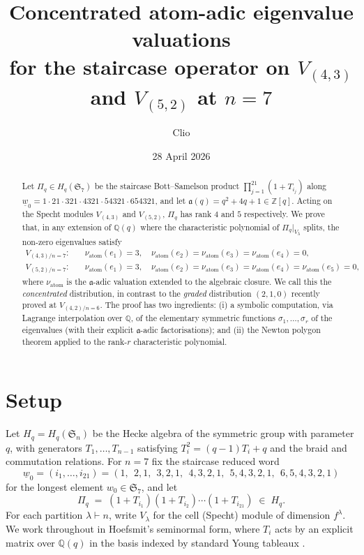\documentclass[11pt]{article}
\title{Concentrated atom-adic eigenvalue valuations \\
       for the staircase operator on $V_{(4,3)}$ and $V_{(5,2)}$ at $n = 7$}
\author{Clio}
\date{28 April 2026}
\theoremstyle{plain}
\theoremstyle{definition}
\theoremstyle{remark}
\newcommand{\Z}{\mathbb{Z}}
\newcommand{\Q}{\mathbb{Q}}
\newcommand{\Sym}{\mathfrak{S}}
\newcommand{\Hq}{H_q}
\newcommand{\Pibs}{\Pi_q}
\newcommand{\Vlam}{V_\lambda}
\newcommand{\val}{\nu_{\mathrm{atom}}}
\newcommand{\atom}{\mathfrak{a}}
\begin{document}
\maketitle

\begin{abstract}
Let $\Pibs \in \Hq(\Sym_7)$ be the staircase Bott--Samelson product
$\prod_{j=1}^{21}(1 + T_{i_j})$ along $\underline{w}_0 = 1 \cdot 21 \cdot 321 \cdot 4321 \cdot 54321 \cdot 654321$, and let
$\atom(q) = q^2 + 4q + 1 \in \Z[q]$.  Acting on the Specht modules $V_{(4,3)}$ and $V_{(5,2)}$,
$\Pibs$ has rank $4$ and $5$ respectively.  We prove that, in any extension of $\Q(q)$ where the
characteristic polynomial of $\Pibs|_{V_\lambda}$ splits, the non-zero
eigenvalues satisfy
\begin{align*}
V_{(4,3)/n=7}: \quad &\val(e_1) = 3, \quad \val(e_2) = \val(e_3) = \val(e_4) = 0, \\
V_{(5,2)/n=7}: \quad &\val(e_1) = 3, \quad \val(e_2) = \val(e_3) = \val(e_4) = \val(e_5) = 0,
\end{align*}
where $\val$ is the $\atom$-adic valuation extended to the algebraic closure.
We call this the \emph{concentrated} distribution, in contrast to the \emph{graded}
distribution $(2,1,0)$ recently proved at $V_{(4,2)/n=6}$.
The proof has two ingredients: (i) a symbolic computation, via Lagrange interpolation
over $\Q$, of the elementary symmetric functions $\sigma_1,\ldots,\sigma_r$ of the
eigenvalues (with their explicit $\atom$-adic factorisations); and (ii) the Newton
polygon theorem applied to the rank-$r$ characteristic polynomial.
\end{abstract}

\section{Setup}

Let $\Hq = \Hq(\Sym_n)$ be the Hecke algebra of the symmetric group with parameter
$q$, with generators $T_1, \ldots, T_{n-1}$ satisfying $T_i^2 = (q-1)T_i + q$ and
the braid and commutation relations.  For $n = 7$ fix the staircase reduced word
\[ \underline{w}_0 = (i_1, \ldots, i_{21})
   = (1,\ \ 2,1,\ \ 3,2,1,\ \ 4,3,2,1,\ \ 5,4,3,2,1,\ \ 6,5,4,3,2,1) \]
for the longest element $w_0 \in \Sym_7$, and let
\[ \Pibs \;=\; (1 + T_{i_1})(1 + T_{i_2})\cdots(1 + T_{i_{21}}) \;\in\; \Hq. \]
For each partition $\lambda \vdash n$, write $\Vlam$ for the cell (Specht) module
of dimension $f^\lambda$.  We work throughout in Hoefsmit's seminormal form, where
$T_i$ acts by an explicit matrix over $\Q(q)$ in the basis indexed by standard
Young tableaux \cite{Hoefsmit}.
\end{document}
